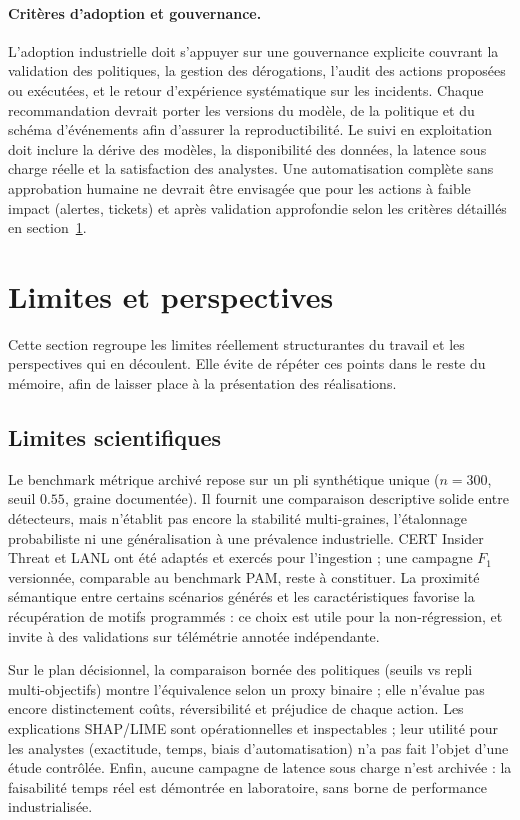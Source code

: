 \documentclass[11pt,a4paper,oneside]{report}
\theoremstyle{definition}
\theoremstyle{plain}
\begin{document}
\paragraph{Critères d'adoption et gouvernance.} L'adoption industrielle doit s'appuyer sur une gouvernance explicite couvrant la validation des politiques, la gestion des dérogations, l'audit des actions proposées ou exécutées, et le retour d'expérience systématique sur les incidents. Chaque recommandation devrait porter les versions du modèle, de la politique et du schéma d'événements afin d'assurer la reproductibilité. Le suivi en exploitation doit inclure la dérive des modèles, la disponibilité des données, la latence sous charge réelle et la satisfaction des analystes. Une automatisation complète sans approbation humaine ne devrait être envisagée que pour les actions à faible impact (alertes, tickets) et après validation approfondie selon les critères détaillés en section~\ref{sec:limites-perspectives}.


\section{Limites et perspectives}
\label{sec:limites-perspectives}

Cette section regroupe les limites réellement structurantes du travail et les perspectives qui en découlent. Elle évite de répéter ces points dans le reste du mémoire, afin de laisser place à la présentation des réalisations.

\subsection{Limites scientifiques}

Le benchmark métrique archivé repose sur un pli synthétique unique ($n=300$, seuil $0.55$, graine documentée). Il fournit une comparaison descriptive solide entre détecteurs, mais n'établit pas encore la stabilité multi-graines, l'étalonnage probabiliste ni une généralisation à une prévalence industrielle. CERT Insider Threat et LANL ont été adaptés et exercés pour l'ingestion ; une campagne $F_1$ versionnée, comparable au benchmark PAM, reste à constituer. La proximité sémantique entre certains scénarios générés et les caractéristiques favorise la récupération de motifs programmés : ce choix est utile pour la non-régression, et invite à des validations sur télémétrie annotée indépendante.

Sur le plan décisionnel, la comparaison bornée des politiques (seuils vs repli multi-objectifs) montre l'équivalence selon un proxy binaire ; elle n'évalue pas encore distinctement coûts, réversibilité et préjudice de chaque action. Les explications SHAP/LIME sont opérationnelles et inspectables ; leur utilité pour les analystes (exactitude, temps, biais d'automatisation) n'a pas fait l'objet d'une étude contrôlée. Enfin, aucune campagne de latence sous charge n'est archivée : la faisabilité temps réel est démontrée en laboratoire, sans borne de performance industrialisée.
\end{document}
